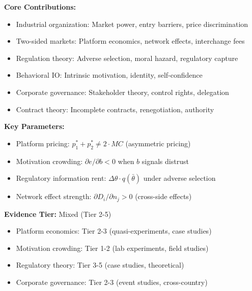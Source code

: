 \begin{tcolorbox}[colback=gray!5!white,colframe=gray!75!black,title=Quick Reference]
\textbf{Core Contributions:}
\begin{itemize}
    \item Industrial organization: Market power, entry barriers, price discrimination
    \item Two-sided markets: Platform economics, network effects, interchange fees
    \item Regulation theory: Adverse selection, moral hazard, regulatory capture
    \item Behavioral IO: Intrinsic motivation, identity, self-confidence
    \item Corporate governance: Stakeholder theory, control rights, delegation
    \item Contract theory: Incomplete contracts, renegotiation, authority
\end{itemize}

\textbf{Key Parameters:}
\begin{itemize}
    \item Platform pricing: $p_1^* + p_2^* \neq 2 \cdot MC$ (asymmetric pricing)
    \item Motivation crowding: $\partial e / \partial b < 0$ when $b$ signals distrust
    \item Regulatory information rent: $\Delta\theta \cdot q(\bar{\theta})$ under adverse selection
    \item Network effect strength: $\partial D_i / \partial n_j > 0$ (cross-side effects)
\end{itemize}

\textbf{Evidence Tier:} Mixed (Tier 2-5)
\begin{itemize}
    \item Platform economics: Tier 2-3 (quasi-experiments, case studies)
    \item Motivation crowding: Tier 1-2 (lab experiments, field studies)
    \item Regulatory theory: Tier 3-5 (case studies, theoretical)
    \item Corporate governance: Tier 2-3 (event studies, cross-country)
\end{itemize}
\end{tcolorbox}


